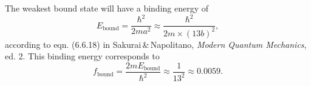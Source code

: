 \documentclass[11pt,letter, swedish, english
]{article}
\begin{document}
The weakest bound state will have a binding energy of
\begin{equation}
E_\text{bound}=\frac{\hbar^2}{2ma^2}\approx\frac{\hbar^2}{2m\times (13b)^2},
\end{equation}
according to eqn. (6.6.18) in Sakurai\,\&\,Napolitano, \textit{Modern
  Quantum Mechanics}, ed. 2.
This binding energy corresponds to 
\begin{equation}
f_\text{bound} = \frac{2mE_\text{bound}}{\hbar^2}
\approx \frac{1}{13^2} \approx 0.0059.
\end{equation}
\end{document}
